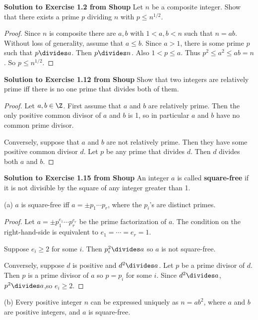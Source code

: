 \documentclass[oneside,12pt]{amsart}
\begin{document}
\textbf{Solution to Exercise 1.2 from Shoup} Let $n$ be a composite integer. Show that there exists a prime $p$ dividing $n$ with $p\leq n^{1/2}$.
\begin{proof}
Since $n$ is composite there are $a,b$ with $1<a,b<n$ such that $n=ab$. Without loss of generality, assume that $a\leq b$. Since $a>1$, there is some prime $p$ such that $p\divides a$. Then $p\divides n$. Also $1<p\leq a$.
Thus $p^2\leq a^2 \leq ab=n$. So $p\leq n^{1/2}$.
\end{proof}

\bigskip

\textbf{Solution to Exercise 1.12 from Shoup} Show that two integers are relatively prime iff there is no one prime that divides both of them.
\begin{proof}
Let $a,b\in \Z$. First assume that $a$ and $b$ are relatively prime.
Then the only positive common divisor of $a$ and $b$ is 1, so in particular $a$ and $b$ have no common prime divisor.

Conversely, suppose that $a$ and $b$ are not relatively prime. Then they have some positive common divisor $d$. Let $p$ be any prime that divides $d$. Then $d$ divides both $a$ and $b$.
\end{proof}

\bigskip

\textbf{Solution to Exercise 1.15 from Shoup} An integer $a$ is called \textbf{square-free} if it is not divisible by the square of any integer greater than 1.

(a) $a$ is square-free iff $a=\pm p_1 \cdots p_r$, where the $p_i$'s are distinct primes.

\begin{proof}
Let $a=\pm p_1^{e_1} \cdots p_r^{e_r}$ be the prime factorization of $a$.
The condition on the right-hand-side is equivalent to $e_1=\cdots=e_r=1$.

Suppose $e_i\geq 2$ for some $i$. Then $p_i^2\divides a$ so $a$ is not square-free.

Conversely, suppose $d$ is positive and $d^2\divides a$. Let $p$ be a prime
divisor of $d$. Then $p$ is a prime divisor of $a$ so $p=p_i$ for some $i$.
Since $d^2\divides a$, $p^2\divides a$,so $e_i\geq 2$.
\end{proof}

\medskip

(b) Every positive integer $n$ can be expressed uniquely as $n=ab^2$, where $a$ and $b$ are positive integers, and $a$ is square-free.
\end{document}

